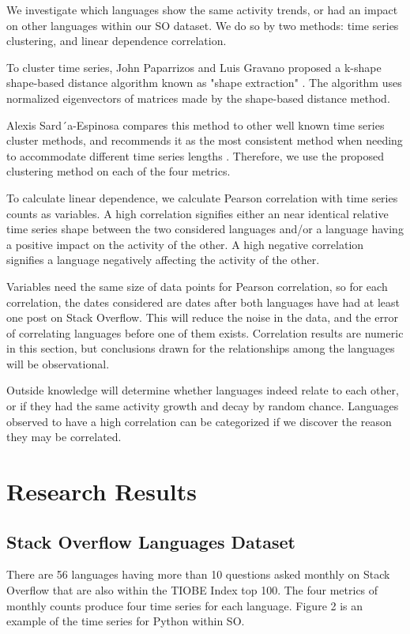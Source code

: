 \documentclass[conference]{IEEEtran}
\begin{document}
We investigate which languages show the same activity trends, or had an impact on other languages within our SO dataset. We do so by two methods: time series clustering, and linear dependence correlation.

To cluster time series, John Paparrizos and Luis Gravano proposed a k-shape shape-based distance algorithm known as "shape extraction" \cite{sbd}. The algorithm uses normalized eigenvectors of matrices made by the shape-based distance method. 

Alexis Sard´a-Espinosa compares this method to other well known time series cluster methods, and recommends it as the most consistent method when needing to accommodate different time series lengths \cite{cluster}. Therefore, we use the proposed clustering method on each of the four metrics.

To calculate linear dependence, we calculate Pearson correlation with time series counts as variables. A high correlation signifies either an near identical relative time series shape between the two considered languages and/or a language having a positive impact on the activity of the other. A high negative correlation signifies a language negatively affecting the activity of the other.

Variables need the same size of data points for Pearson correlation, so for each correlation, the dates considered are dates after both languages have had at least one post on Stack Overflow. This will reduce the noise in the data, and the error of correlating languages before one of them exists. Correlation results are numeric in this section, but conclusions drawn for the relationships among the languages will be observational.

Outside knowledge will determine whether languages indeed relate to each other, or if they had the same activity growth and decay by random chance. Languages observed to have a high correlation can be categorized if we discover the reason they may be correlated.


\section{Research Results}

\subsection{Stack Overflow Languages Dataset}
There are 56 languages having more than 10 questions asked monthly on Stack Overflow that are also within the TIOBE Index top 100. The four metrics of monthly counts produce four time series for each language. Figure 2 is an example of the time series for Python within SO.
\end{document}
